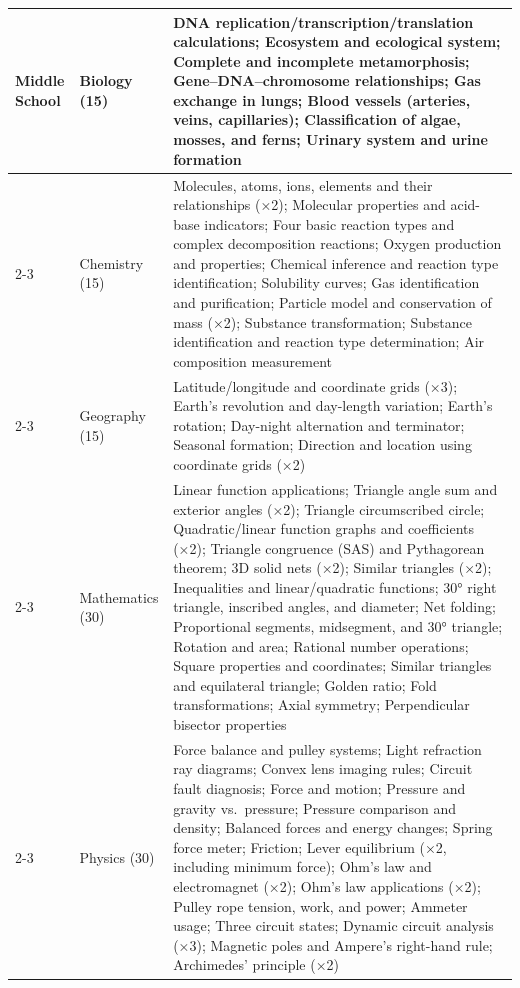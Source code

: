 \documentclass[11pt]{article}
\begin{document}
\begin{table}[!ht]
\begin{tabular}{llp{10cm}}
\hline
\multirow{5}{*}{Middle School}
 & Biology (15)
 & DNA replication/transcription/translation calculations; Ecosystem and ecological system; Complete and incomplete metamorphosis; Gene–DNA–chromosome relationships; Gas exchange in lungs; Blood vessels (arteries, veins, capillaries); Classification of algae, mosses, and ferns; Urinary system and urine formation \\
\cline{2-3}
 & Chemistry (15)
 & Molecules, atoms, ions, elements and their relationships (×2); Molecular properties and acid-base indicators; Four basic reaction types and complex decomposition reactions; Oxygen production and properties; Chemical inference and reaction type identification; Solubility curves; Gas identification and purification; Particle model and conservation of mass (×2); Substance transformation; Substance identification and reaction type determination; Air composition measurement \\
\cline{2-3}
 & Geography (15)
 & Latitude/longitude and coordinate grids (×3); Earth's revolution and day-length variation; Earth's rotation; Day-night alternation and terminator; Seasonal formation; Direction and location using coordinate grids (×2) \\
\cline{2-3}
 & Mathematics (30)
 & Linear function applications; Triangle angle sum and exterior angles (×2); Triangle circumscribed circle; Quadratic/linear function graphs and coefficients (×2); Triangle congruence (SAS) and Pythagorean theorem; 3D solid nets (×2); Similar triangles (×2); Inequalities and linear/quadratic functions; 30° right triangle, inscribed angles, and diameter; Net folding; Proportional segments, midsegment, and 30° triangle; Rotation and area; Rational number operations; Square properties and coordinates; Similar triangles and equilateral triangle; Golden ratio; Fold transformations; Axial symmetry; Perpendicular bisector properties \\
\cline{2-3}
 & Physics (30)
 & Force balance and pulley systems; Light refraction ray diagrams; Convex lens imaging rules; Circuit fault diagnosis; Force and motion; Pressure and gravity vs.\ pressure; Pressure comparison and density; Balanced forces and energy changes; Spring force meter; Friction; Lever equilibrium (×2, including minimum force); Ohm's law and electromagnet (×2); Ohm's law applications (×2); Pulley rope tension, work, and power; Ammeter usage; Three circuit states; Dynamic circuit analysis (×3); Magnetic poles and Ampere's right-hand rule; Archimedes' principle (×2) \\
\hline

\end{tabular}
\end{table}
\end{document}
